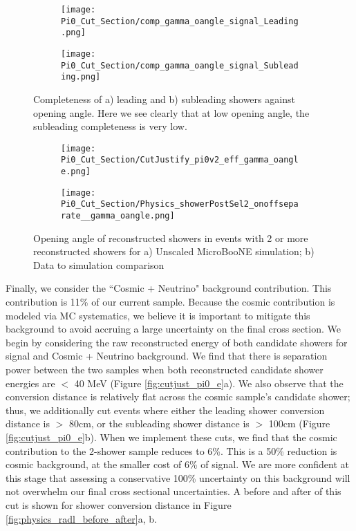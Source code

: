 \begin{figure}[H]
\centering
  \begin{subfigure}[t]{0.35\textwidth}
    \centering
\texttt{[image: Pi0\_Cut\_Section/comp\_gamma\_oangle\_signal\_Leading.png]}
  \caption{ }
  \end{subfigure} 
  \hspace{20mm}
  \begin{subfigure}[t]{0.35\textwidth}
    \centering
    \texttt{[image: Pi0\_Cut\_Section/comp\_gamma\_oangle\_signal\_Subleading.png]}
  \caption{ }
  \end{subfigure} 
\caption{ Completeness of a) leading and b) subleading showers against opening angle. Here we see clearly that at low opening angle, the subleading completeness is very low. }
\label{fig:comp_cutjust_pi0_OA}
\end{figure}

\begin{figure}[H]
\centering
  \begin{subfigure}[t]{0.35\textwidth}
    \centering
\texttt{[image: Pi0\_Cut\_Section/CutJustify\_pi0v2\_eff\_gamma\_oangle.png]}
  \caption{ }
  \end{subfigure} 
  \hspace{20mm}
  \begin{subfigure}[t]{0.35\textwidth}
    \centering
    \texttt{[image: Pi0\_Cut\_Section/Physics\_showerPostSel2\_onoffseparate\_\_gamma\_oangle.png]}
  \caption{ }
  \end{subfigure} 
\caption{ Opening angle of reconstructed showers in events with 2 or more reconstructed showers for a) Unscaled MicroBooNE simulation; b) Data to simulation comparison }
\label{fig:cutjust_pi0_OA}
\end{figure}


Finally, we consider the ``Cosmic + Neutrino" background contribution. This contribution is 11\% of our current sample. Because the cosmic contribution is modeled via MC systematics, we believe it is important to mitigate this background to avoid accruing a large uncertainty on the final cross section.  We begin by considering the raw reconstructed energy of both candidate showers for signal and Cosmic + Neutrino background. We find that there is separation power between the two samples when both reconstructed candidate shower energies are $<$ 40 MeV (Figure \ref{fig:cutjust_pi0_e}a).  We also observe that the conversion distance is relatively flat across the cosmic sample's candidate shower; thus, we additionally cut events where either the leading shower conversion distance is $>$ 80cm, or the subleading shower distance is $>$ 100cm (Figure \ref{fig:cutjust_pi0_e}b). When we implement these cuts, we find that the cosmic contribution to the 2-shower sample reduces to 6\%. This is a 50\% reduction is cosmic background, at the smaller cost of 6\% of signal. We are more confident at this stage that assessing a conservative 100\% uncertainty on this background will not overwhelm our final cross sectional uncertainties. A before and after of this cut is shown for shower conversion distance in Figure \ref{fig:physics_radl_before_after}a, b.
 

